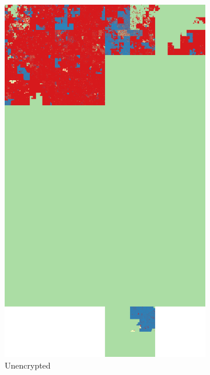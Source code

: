 \documentclass[
  digital, %
  color,   %
  oneside, %
  lof,     %
  nolot,     %
]{fithesis4}
\begin{document}
\begin{figure}
  \centering
  \begin{subfigure}[t]{.45\textwidth}
    \centering
    \includegraphics[width=\textwidth,interpolate=false]{win-unencrypted-chi2-4-hilbert.png}
    \caption{Unencrypted}
    \label{fig:bitlocker-unenc}
  \end{subfigure}
  \hfill
  \begin{subfigure}[t]{.45\textwidth}
    \centering

\end{subfigure}
\end{figure}
\end{document}
